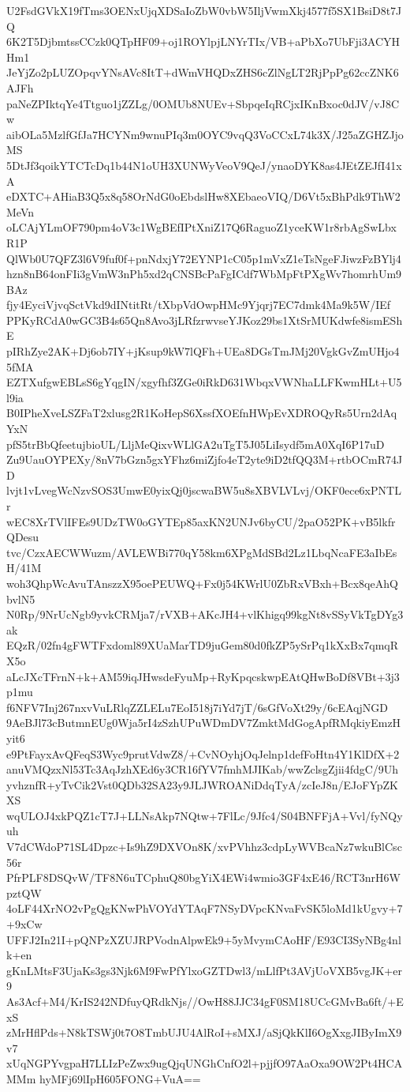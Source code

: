 U2FsdGVkX19fTms3OENxUjqXDSaIoZbW0vbW5IljVwmXkj4577f5SX1BsiD8t7JQ
6K2T5DjbmtssCCzk0QTpHF09+oj1ROYlpjLNYrTIx/VB+aPbXo7UbFji3ACYHHm1
JeYjZo2pLUZOpqvYNsAVc8ItT+dWmVHQDxZHS6cZlNgLT2RjPpPg62ccZNK6AJFh
paNeZPIktqYe4Ttguo1jZZLg/0OMUb8NUEv+SbpqeIqRCjxIKnBxoc0dJV/vJ8Cw
aibOLa5MzlfGfJa7HCYNm9wnuPIq3m0OYC9vqQ3VoCCxL74k3X/J25aZGHZJjoMS
5DtJf3qoikYTCTcDq1b44N1oUH3XUNWyVeoV9QeJ/ynaoDYK8as4JEtZEJfI41xA
eDXTC+AHiaB3Q5x8q58OrNdG0oEbdslHw8XEbaeoVIQ/D6Vt5xBhPdk9ThW2MeVn
oLCAjYLmOF790pm4oV3c1WgBEfIPtXniZ17Q6RaguoZ1yceKW1r8rbAgSwLbxR1P
QlWb0U7QFZ3l6V9fuf0f+pnNdxjY72EYNP1cC05p1mVxZ1eTsNgeFJiwzFzBYlj4
hzn8nB64onFIi3gVmW3nPh5xd2qCNSBcPaFgICdf7WbMpFtPXgWv7homrhUm9BAz
fjy4EyciVjvqSctVkd9dINtitRt/tXbpVdOwpHMc9Yjqrj7EC7dmk4Ma9k5W/IEf
PPKyRCdA0wGC3B4s65Qn8Avo3jLRfzrwvseYJKoz29bs1XtSrMUKdwfe8ismEShE
pIRhZye2AK+Dj6ob7IY+jKsup9kW7lQFh+UEa8DGsTmJMj20VgkGvZmUHjo45fMA
EZTXufgwEBLsS6gYqgIN/xgyfhf3ZGe0iRkD631WbqxVWNhaLLFKwmHLt+U5l9ia
B0IPheXveLSZFaT2xlusg2R1KoHepS6XssfXOEfnHWpEvXDROQyRs5Urn2dAqYxN
pfS5trBbQfeetujbioUL/LljMeQixvWLlGA2uTgT5J05LiIsydf5mA0XqI6P17uD
Zu9UauOYPEXy/8nV7bGzn5gxYFhz6miZjfo4eT2yte9iD2tfQQ3M+rtbOCmR74JD
lvjt1vLvegWcNzvSOS3UmwE0yixQj0jscwaBW5u8sXBVLVLvj/OKF0ece6xPNTLr
wEC8XrTVlIFEs9UDzTW0oGYTEp85axKN2UNJv6byCU/2paO52PK+vB5lkfrQDesu
tvc/CzxAECWWuzm/AVLEWBi770qY58km6XPgMdSBd2Lz1LbqNcaFE3aIbEsH/41M
woh3QhpWcAvuTAnszzX95oePEUWQ+Fx0j54KWrlU0ZbRxVBxh+Bcx8qeAhQbvlN5
N0Rp/9NrUcNgb9yvkCRMja7/rVXB+AKcJH4+vlKhigq99kgNt8vSSyVkTgDYg3ak
EQzR/02fn4gFWTFxdoml89XUaMarTD9juGem80d0fkZP5ySrPq1kXxBx7qmqRX5o
aLcJXcTFrnN+k+AM59iqJHwsdeFyuMp+RyKpqcskwpEAtQHwBoDf8VBt+3j3p1mu
f6NFV7Inj267nxvVuLRlqZZLELu7EoI518j7iYd7jT/6sGfVoXt29y/6cEAqjNGD
9AeBJl73cButmnEUg0Wja5rI4zSzhUPuWDmDV7ZmktMdGogApfRMqkiyEmzHyit6
e9PtFayxAvQFeqS3Wyc9prutVdwZ8/+CvNOyhjOqJelnp1defFoHtn4Y1KlDfX+2
anuVMQzxNl53Tc3AqJzhXEd6y3CR16fYV7fmhMJIKab/wwZclsgZjii4fdgC/9Uh
yvhznfR+yTvCik2Vst0QDb32SA23y9JLJWROANiDdqTyA/zcIeJ8n/EJoFYpZKXS
wqULOJ4xkPQZ1cT7J+LLNsAkp7NQtw+7FlLc/9Jfc4/S04BNFFjA+Vvl/fyNQyuh
V7dCWdoP71SL4Dpzc+Is9hZ9DXVOn8K/xvPVhhz3cdpLyWVBcaNz7wkuBlCsc56r
PfrPLF8DSQvW/TF8N6uTCphuQ80bgYiX4EWi4wmio3GF4xE46/RCT3nrH6WpztQW
4oLF44XrNO2vPgQgKNwPhVOYdYTAqF7NSyDVpcKNvaFvSK5loMd1kUgvy+7+9xCw
UFFJ2In21I+pQNPzXZUJRPVodnAlpwEk9+5yMvymCAoHF/E93CI3SyNBg4nlk+en
gKnLMtsF3UjaKs3gs3Njk6M9FwPfYlxoGZTDwl3/mLlfPt3AVjUoVXB5vgJK+er9
As3Acf+M4/KrIS242NDfuyQRdkNjs//OwH88JJC34gF0SM18UCcGMvBa6ft/+ExS
zMrHflPds+N8kTSWj0t7O8TmbUJU4AlRoI+sMXJ/aSjQkKlI6OgXxgJIByImX9v7
xUqNGPYvgpaH7LLIzPeZwx9ugQjqUNGhCnfO2l+pjjfO97AaOxa9OW2Pt4HCAMMm
hyMFj69lIpH605FONG+VuA==
